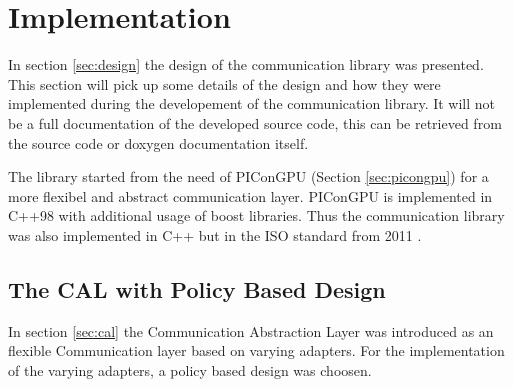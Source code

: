 \chapter{Implementation}
\label{sec:implementation}



In section \ref{sec:design} the design of the communication library
was presented.  This section will pick up some details of the design
and how they were implemented during the developement of the
communication library. It will not be a full documentation of the
developed source code, this can be retrieved from the source code
or doxygen \cite{ref:doxygen} documentation itself.

The library started from the need of PIConGPU (Section \ref{sec:picongpu})
for a more flexibel and abstract communication layer. PIConGPU is implemented
in C++98 with additional usage of boost \cite{ref:boost} libraries. Thus
the communication library was also implemented in C++ but in the
ISO standard from 2011 \cite{ref:c++11}.



\section{The CAL with Policy Based Design}
  In section \ref{sec:cal} the Communication Abstraction Layer was
  introduced as an flexible Communication layer based on varying
  adapters. For the implementation of the varying adapters, a policy
  based design was choosen.

